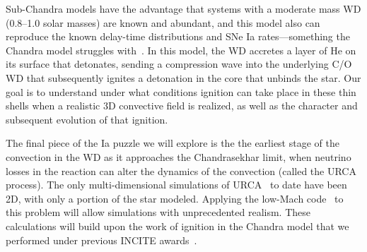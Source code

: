 Sub-Chandra models
have the advantage that systems with a moderate mass WD
(0.8--1.0 solar masses) are known and abundant, and this model also
can reproduce the known delay-time distributions and SNe Ia
rates---something the Chandra model struggles with~\cite{ruiter:2011}.
In this model, the WD accretes a layer of He on its surface
that detonates, sending a compression wave into the underlying C/O WD
that subsequently ignites a detonation in the core that unbinds the
star.
Our goal is to understand under what
conditions ignition can take place in these thin shells when a
realistic 3D convective field is realized, as well as the character
and subsequent evolution of that ignition.

The final piece of the Ia puzzle we will explore is the the earliest
stage of the convection in the WD as it approaches the Chandrasekhar
limit,
when neutrino losses in the reaction can alter the dynamics of the
convection (called the URCA process).  The only multi-dimensional
simulations of URCA~\cite{URCA} to date have been 2D, with only a
portion of the star modeled.  Applying the low-Mach code \maestro\ to
this problem will allow simulations with unprecedented realism.  These
calculations will build upon the work of ignition in the Chandra model
that we performed under previous INCITE awards~\cite{Non12}.
